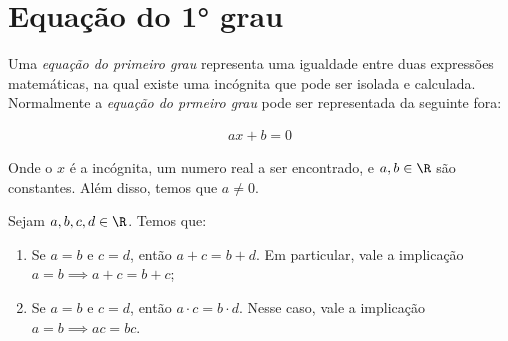 \section{Equação do 1° grau}

Uma \emph{equação do primeiro grau} representa uma igualdade entre duas expressões matemáticas, na qual existe uma incógnita que pode ser isolada e calculada. Normalmente a \emph{equação do prmeiro grau} pode ser representada da seguinte fora:

\begin{align*}
    ax+b=0
\end{align*}

Onde o $x$ é a incógnita, um numero real a ser encontrado, e $a,b\in \R$ são constantes. Além disso, temos que $a \neq 0$.


\begin{proposition}[Propriedades]
    \label{prop:props-eq}
    Sejam $a, b, c, d \in \R$. Temos que:
    \begin{enumerate}
        \item 
        \label{eq:soma} 
        Se $a = b$ e $c = d$, então $a + c = b + d$. Em particular, vale a implicação $a=b \implies a+c = b+c$;
        \item 
        \label{eq:multiplicacao}
        Se $a = b$ e $c = d$, então $a \cdot c = b \cdot d$. Nesse caso, vale a  implicação $a=b \implies ac = bc$.
    \end{enumerate}
\end{proposition}